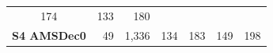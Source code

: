 \documentclass[]{article}
\begin{document}
\begin{longtable}[]{@{}crrrrrr@{}}
\begin{minipage}[t]{0.09\columnwidth}
174\strut
\end{minipage} & \begin{minipage}[t]{0.16\columnwidth}\raggedleft\strut
133\strut
\end{minipage} & \begin{minipage}[t]{0.17\columnwidth}\raggedleft\strut
180\strut
\end{minipage}\tabularnewline
\begin{minipage}[t]{0.12\columnwidth}\centering\strut
\textbf{S4 AMSDec0}\strut
\end{minipage} & \begin{minipage}[t]{0.13\columnwidth}\raggedleft\strut
49\strut
\end{minipage} & \begin{minipage}[t]{0.06\columnwidth}\raggedleft\strut
1,336\strut
\end{minipage} & \begin{minipage}[t]{0.07\columnwidth}\raggedleft\strut
134\strut
\end{minipage} & \begin{minipage}[t]{0.09\columnwidth}\raggedleft\strut
183\strut
\end{minipage} & \begin{minipage}[t]{0.16\columnwidth}\raggedleft\strut
149\strut
\end{minipage} & \begin{minipage}[t]{0.17\columnwidth}\raggedleft\strut
198\strut
\end{minipage}\tabularnewline
\bottomrule
\end{longtable}
\end{document}
